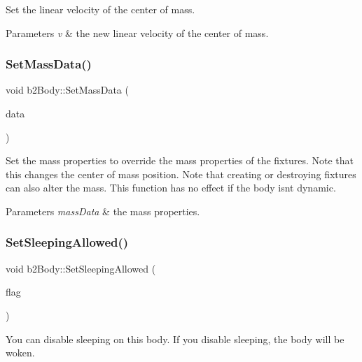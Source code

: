 Set the linear velocity of the center of mass. 
\begin{DoxyParams}{Parameters}
{\em v} & the new linear velocity of the center of mass. \\
\hline
\end{DoxyParams}
\mbox{\label{classb2_body_a58a641fedf8a81e1e26d09ec00a22fe2}} 
\subsubsection{\texorpdfstring{Set\+Mass\+Data()}{SetMassData()}}
{\footnotesize\ttfamily void b2\+Body\+::\+Set\+Mass\+Data (\begin{DoxyParamCaption}\item[{const \hyperlink{structb2_mass_data}{b2\+Mass\+Data} $\ast$}]{data }\end{DoxyParamCaption})}

Set the mass properties to override the mass properties of the fixtures. Note that this changes the center of mass position. Note that creating or destroying fixtures can also alter the mass. This function has no effect if the body isn\textquotesingle{}t dynamic. 
\begin{DoxyParams}{Parameters}
{\em mass\+Data} & the mass properties. \\
\hline
\end{DoxyParams}
\mbox{\label{classb2_body_a229a6de228416203fecbf7a7544c33bb}} 
\subsubsection{\texorpdfstring{Set\+Sleeping\+Allowed()}{SetSleepingAllowed()}}
{\footnotesize\ttfamily void b2\+Body\+::\+Set\+Sleeping\+Allowed (\begin{DoxyParamCaption}\item[{bool}]{flag }\end{DoxyParamCaption})\hspace{0.3cm}{\ttfamily [inline]}}

You can disable sleeping on this body. If you disable sleeping, the body will be woken. \mbox{\label{classb2_body_a4686f32bbce5723761e9719c706eca11}} 
